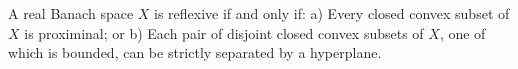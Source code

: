 A real Banach space $X$ is reflexive if and only if: a) Every closed convex subset of $X$ is proximinal; or b) Each pair of disjoint closed convex subsets of $X$, one of which is bounded, can be strictly separated by a hyperplane.